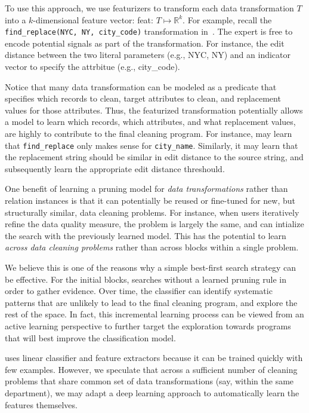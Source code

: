 To use this approach, we use featurizers to transform each data transformation $T$ into a $k$-dimensional feature vector: \textsf{feat}: $T\mapsto\mathbb{R}^k$.
For example, recall the \texttt{find\_replace(NYC, NY, city\_code)} transformation in~.
The expert is free to encode potential signals as part of the transformation.  For instance, the edit distance between the two literal parameters (e.g., NYC, NY) and an indicator vector to specify the attrbitue (e.g., city\_code).  

Notice that many data transformation can be modeled as a predicate that specifies which records to clean, target attributes to clean, and replacement values for those attributes.  Thus, the featurized transformation potentially allows a model to learn which records, which attributes, and what replacement values, are highly to contribute to the final cleaning program.  For instance, \sys may learn that \texttt{find\_replace} only makes sense for \texttt{city\_name}.  Similarly, it may learn that the replacement string should be similar in edit distance to the source string, and subsequently learn the appropriate edit distance threshould.

One benefit of learning a pruning model for {\it data transformations} rather than relation instances is that it can potentially be reused or fine-tuned for new, but structurally similar, data cleaning problems.  For instance, when users iteratively refine the data quality measure, the problem is largely the same, and \sys can intialize the search with the previously learned model.  This has the potential to learn  {\it across data cleaning problems} rather than across blocks within a single problem.   


 We believe this is one of the reasons why a simple best-first search strategy can be effective.  For the initial blocks, \sys searches without a learned pruning rule in order to gather evidence.  Over time, the classifier can identify systematic patterns that are unlikely to lead to the final cleaning program, and explore the rest of the space.  In fact, this incremental learning process can be viewed from an active learning perspective to further target the exploration towards programs that will best improve the classification model.  

\sys uses linear classifier and feature extractors because it can be trained quickly with few examples.   However, we speculate that across a sufficient number of cleaning problems that share common set of data transformations (say, within the same department), we may adapt a deep learning approach to automatically learn the features themselves.  

